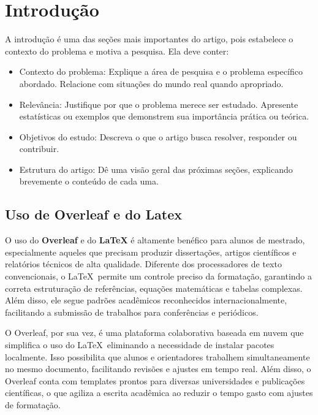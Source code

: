 \section{Introdução}

A introdução é uma das seções mais importantes do artigo, pois estabelece o contexto do problema e motiva a pesquisa. Ela deve conter:
\begin{itemize}
    \item Contexto do problema: Explique a área de pesquisa e o problema específico abordado. Relacione com situações do mundo real quando apropriado.

\item  Relevância: Justifique por que o problema merece ser estudado. Apresente estatísticas ou exemplos que demonstrem sua importância prática ou teórica.

\item Objetivos do estudo: Descreva o que o artigo busca resolver, responder ou contribuir.

\item Estrutura do artigo: Dê uma visão geral das próximas seções, explicando brevemente o conteúdo de cada uma.
\end{itemize}
\subsection{Uso de Overleaf e do Latex}

O uso do \textbf{Overleaf} e do \textbf{LaTeX} é altamente benéfico para alunos de mestrado, especialmente aqueles que precisam produzir dissertações, artigos científicos e relatórios técnicos de alta qualidade. Diferente dos processadores de texto convencionais, o \LaTeX\ permite um controle preciso da formatação, garantindo a correta estruturação de referências, equações matemáticas e tabelas complexas. Além disso, ele segue padrões acadêmicos reconhecidos internacionalmente, facilitando a submissão de trabalhos para conferências e periódicos.  

O Overleaf, por sua vez, é uma plataforma colaborativa baseada em nuvem que simplifica o uso do \LaTeX\, eliminando a necessidade de instalar pacotes localmente. Isso possibilita que alunos e orientadores trabalhem simultaneamente no mesmo documento, facilitando revisões e ajustes em tempo real. Além disso, o Overleaf conta com templates prontos para diversas universidades e publicações científicas, o que agiliza a escrita acadêmica ao reduzir o tempo gasto com ajustes de formatação.  

